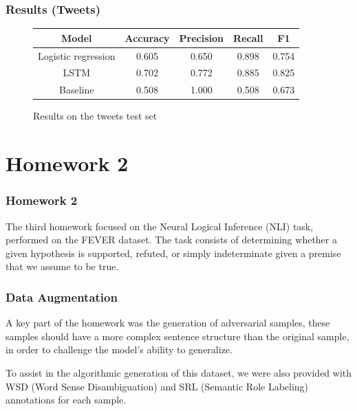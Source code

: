 \documentclass[english, xcolor={table,usenames}]{beamer}
\begin{document}
\begin{frame}
  \frametitle{Results (Tweets)}

  \begin{figure}[h]
    \centering
    \caption{Results on the tweets test set}
    \begin{tabular}{|c|c|c|c|c|}
      \hline
      Model               & Accuracy & Precision & Recall & F1    \\
      \hline
      \hline
      Logistic regression & 0.605    & 0.650     & 0.898  & 0.754 \\
      LSTM                & 0.702    & 0.772     & 0.885  & 0.825 \\
      Baseline            & 0.508    & 1.000     & 0.508  & 0.673 \\
      \hline
    \end{tabular}
  \end{figure}
\end{frame}

\section{Homework 2}

\begin{frame}
  \frametitle{Homework 2}

  The third homework focused on the \alert{Neural Logical Inference} (NLI) task, performed
  on the FEVER dataset. The task consists of determining whether a given hypothesis is
  \alert{supported}, \alert{refuted}, or simply \alert{indeterminate} given a premise that we assume to be true.
\end{frame}

\begin{frame}
  \frametitle{Data Augmentation}

  A key part of the homework was the generation of \alert{adversarial} samples, these samples
  should have a more complex sentence structure than the original sample, in order to
  challenge the model's ability to \alert{generalize}.

  To assist in the algorithmic generation of this dataset, we were also provided with
  WSD (Word Sense Disambiguation) and SRL (Semantic Role Labeling) annotations for
  each sample.
\end{frame}
\end{document}
